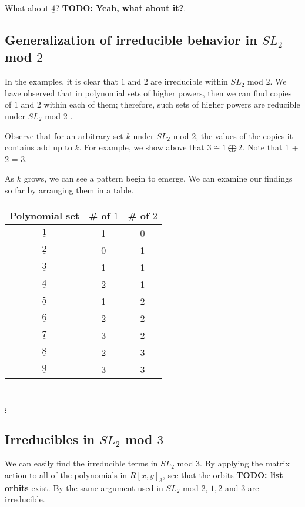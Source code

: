 \documentclass[a4paper,draft]{amsproc}
\theoremstyle{plain}
\theoremstyle{definition}
\theoremstyle{remark}
\numberwithin{equation}{section}
\begin{document}
What about $\underline{4}$? \textbf{TODO: Yeah, what about it?}. 

\subsection{Generalization of irreducible behavior in $SL_{2}$ mod $2$}
In the examples, it is clear that $\underline{1}$ and $\underline{2}$ are irreducible within $SL_{2}$ mod $2$. We have observed that in polynomial sets of higher powers, then we can find copies of $\underline{1}$ and $\underline{2}$ within each of them; therefore, such sets of higher powers are reducible under $SL_{2}$ mod $2$ . 

Observe that for an arbitrary set $\underline{k}$ under $SL_{2}$ mod $2$, the values of the copies it contains add up to $k$. For example, we show above that $\underline{3} \cong \underline{1} \bigoplus \underline{2}$. Note that 1 + 2 = 3. 

As $k$ grows, we can see a pattern begin to emerge. We can examine our findings so far by arranging them in a table. 

\begin{table}
    \begin{tabular}{|c|c|c|} 
	\hline
    Polynomial set & \# of $\underline{1}$ & \# of $\underline{2}$ \\ \hline
    $\underline{1}$ & 1 & 0 \\ \hline
    $\underline{2}$ & 0 & 1 \\ \hline
    $\underline{3}$ & 1 & 1 \\ \hline
    $\underline{4}$ & 2 & 1 \\ \hline
    $\underline{5}$ & 1 & 2 \\ \hline
    $\underline{6}$ & 2 & 2 \\ \hline
    $\underline{7}$ & 3 & 2 \\ \hline
    $\underline{8}$ & 2 & 3 \\ \hline
    $\underline{9}$ & 3 & 3 \\ \hline
    \end{tabular} \\
\begin{centering}$\vdots$\end{centering}
\end{table}

\subsection{Irreducibles in $SL_{2}$ mod $3$}
We can easily find the irreducible terms in $SL_{2}$ mod $3$. By applying the matrix action to all of the polynomials in  $R[x,y]_{3}$, see that the orbits \textbf{TODO: list orbits} exist. By the same argument used in $SL_{2}$ mod $2$, $\underline{1}, \underline{2}$ and $\underline{3}$ are irreducible. 
\end{document}
